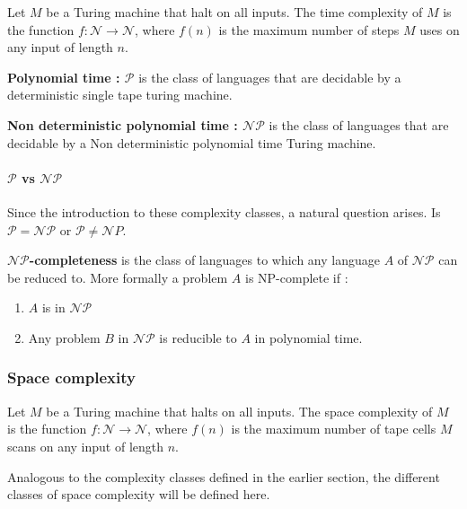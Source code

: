 \begin{defn}
Let $M$ be a Turing machine that halt on all inputs. The time complexity of $M$ is the function $f : \mathcal{N} \rightarrow  \mathcal{N}$, where $f(n)$ is the maximum number of steps $M$ uses on any input of length $n$. 
\end{defn}

\begin{defn}
\textbf{Polynomial time : $\mathcal{P}$} is the class of languages that are decidable by a deterministic single tape turing machine.
\end{defn}

\begin{defn}
\textbf{Non deterministic polynomial time : $\mathcal{NP}$} is the class of languages that are decidable by a Non deterministic polynomial time Turing machine.
\end{defn}

\paragraph{$\mathcal{P}$ vs $\mathcal{NP}$}
Since the introduction to these complexity classes, a natural question arises. Is $\mathcal{P}=\mathcal{NP}$ or $\mathcal{P} \neq \mathcal{N}P $. 
\begin{defn}
\textbf{$\mathcal{NP}$-completeness} is the class of languages to which any language $A$ of $\mathcal{NP}$ can be reduced to. 
More formally a problem $A$ is NP-complete if : 
\begin{enumerate}
    \item $A$ is in $\mathcal{NP}$
    \item Any problem $B$ in $\mathcal{NP}$ is reducible to $A$ in polynomial time. 
\end{enumerate}
\end{defn}

\subsubsection{Space complexity}

\begin{defn}
Let $M$ be a Turing machine that halts on all inputs. The space complexity of $M$ is the function $f : \mathcal{N} \rightarrow  \mathcal{N}$, where $f(n)$ is the maximum number of tape cells $M$ scans on any input of length $n$. 
\end{defn}

Analogous to the complexity classes defined in the earlier section,
the different classes of space complexity will be defined here. 

